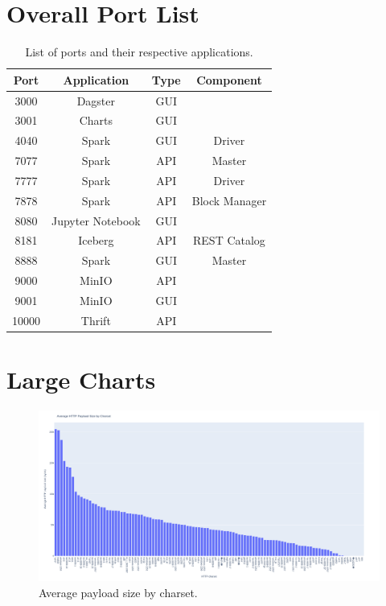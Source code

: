 \clearpage
\section{Overall Port List}
\label{sec:appendix-ports}

\begin{table}[H]
    \centering
    \begin{tabular}{|c|c|c|c|}
    \hline
    \textbf{Port} & \textbf{Application} & \textbf{Type} & \textbf{Component} \\
    \hline
    3000 & Dagster & GUI & ~ \\
    \hline
    3001 & Charts & GUI & ~ \\
    \hline
    4040 & Spark & GUI & Driver \\
    \hline
    7077 & Spark & API & Master \\
    \hline
    7777 & Spark & API & Driver \\
    \hline
    7878 & Spark & API & Block Manager \\
    \hline
    8080 & Jupyter Notebook & GUI & ~ \\
    \hline
    8181 & Iceberg & API & REST Catalog \\
    \hline
    8888 & Spark & GUI & Master \\
    \hline
    9000 & MinIO & API & ~ \\
    \hline
    9001 & MinIO & GUI & ~ \\
    \hline
    10000 & Thrift & API & ~ \\
    \hline
    \end{tabular}
    \caption{List of ports and their respective applications.}
    \label{tab:appendix-ports}
\end{table}


\clearpage
\section{Large Charts}
\label{sec:appendix-charts}

\begin{figure}[H]
    \centering
    \includegraphics[width=0.9\textheight, angle=90]{figures/charts/large/appendix/chart_source_charset_bar_payload_size.png}
    \caption{Average payload size by charset.}
    \label{fig:analysis-dataset-chart_source_charset_bar_payload_size}
\end{figure}

